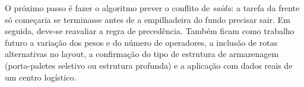 \documentclass[
	article,
	11pt,
	oneside,
	a4paper,
	english,
	brazil,
	sumario=tradicional
	]{abntex2}
\begin{document}
O próximo passo é fazer o algoritmo prever o conflito de \emph{saída}: a tarefa
da frente só começaria se terminasse antes de a empilhadeira do fundo precisar
sair. Em seguida, deve-se reavaliar a regra de precedência. Também ficam como
trabalho futuro a variação dos pesos e do número de operadores, a inclusão de
rotas alternativas no layout, a confirmação do tipo de estrutura de armazenagem
(porta-paletes seletivo ou estrutura profunda) e a aplicação com dados reais de
um centro logístico.

\postextual

\end{document}
